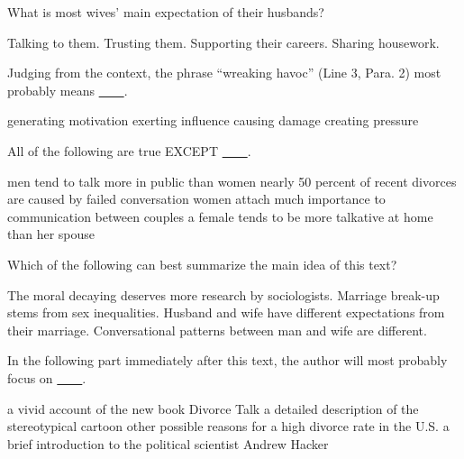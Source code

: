\item What is most wives' main expectation of their husbands?
\begin{tasks}
	\task Talking to them.
	\task Trusting them.
	\task Supporting their careers.
	\task Sharing housework.
\end{tasks}
\item Judging from the context, the phrase ``wreaking havoc'' (Line 3, Para. 2) most probably means \uline{~~~~}.
\begin{tasks}
	\task generating motivation
	\task exerting influence
	\task causing damage
	\task creating pressure
\end{tasks}
\item All of the following are true EXCEPT \uline{~~~~}.
\begin{tasks}
	\task men tend to talk more in public than women
	\task nearly 50 percent of recent divorces are caused by failed conversation
	\task women attach much importance to communication between couples
	\task a female tends to be more talkative at home than her spouse
\end{tasks}
\item Which of the following can best summarize the main idea of this text?
\begin{tasks}
	\task The moral decaying deserves more research by sociologists.
	\task Marriage break-up stems from sex inequalities.
	\task Husband and wife have different expectations from their marriage.
	\task Conversational patterns between man and wife are different.
\end{tasks}
\item In the following part immediately after this text, the author will most probably focus on \uline{~~~~}.
\begin{tasks}
	\task a vivid account of the new book Divorce Talk
	\task a detailed description of the stereotypical cartoon
	\task other possible reasons for a high divorce rate in the U.S.
	\task a brief introduction to the political scientist Andrew Hacker
\end{tasks}